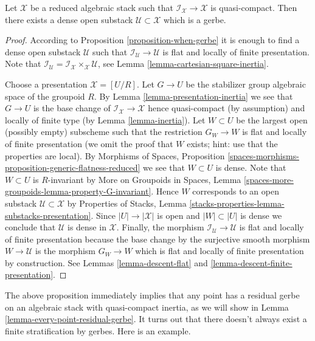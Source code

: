 \begin{proposition}
\label{proposition-open-stratum}
Let $\mathcal{X}$ be a reduced algebraic stack such that
$\mathcal{I}_\mathcal{X} \to \mathcal{X}$ is quasi-compact.
Then there exists a dense open substack $\mathcal{U} \subset \mathcal{X}$
which is a gerbe.
\end{proposition}

\begin{proof}
According to
Proposition \ref{proposition-when-gerbe}
it is enough to find a dense open substack $\mathcal{U}$ such that
$\mathcal{I}_\mathcal{U} \to \mathcal{U}$ is flat and locally of finite
presentation. Note that
$\mathcal{I}_\mathcal{U} =
\mathcal{I}_\mathcal{X} \times_\mathcal{X} \mathcal{U}$, see
Lemma \ref{lemma-cartesian-square-inertia}.

\medskip\noindent
Choose a presentation $\mathcal{X} = [U/R]$. Let $G \to U$ be the stabilizer
group algebraic space of the groupoid $R$. By
Lemma \ref{lemma-presentation-inertia}
we see that $G \to U$ is the base change of
$\mathcal{I}_\mathcal{X} \to \mathcal{X}$ hence quasi-compact (by assumption)
and locally of finite type (by
Lemma \ref{lemma-inertia}).
Let $W \subset U$ be the largest open (possibly empty) subscheme such that
the restriction $G_W \to W$ is flat and locally of finite presentation
(we omit the proof that $W$ exists; hint: use that the properties are local).
By
Morphisms of Spaces, Proposition
\ref{spaces-morphisms-proposition-generic-flatness-reduced}
we see that $W \subset U$ is dense. Note that $W \subset U$ is $R$-invariant
by
More on Groupoids in Spaces, Lemma
\ref{spaces-more-groupoids-lemma-property-G-invariant}.
Hence $W$ corresponds to an open substack $\mathcal{U} \subset \mathcal{X}$ by
Properties of Stacks, Lemma
\ref{stacks-properties-lemma-substacks-presentation}.
Since $|U| \to |\mathcal{X}|$ is open and $|W| \subset |U|$ is dense we
conclude that $\mathcal{U}$ is dense in $\mathcal{X}$.
Finally, the morphism $\mathcal{I}_\mathcal{U} \to \mathcal{U}$
is flat and locally of finite presentation because the base change by
the surjective smooth morphism $W \to \mathcal{U}$ is the morphism
$G_W \to W$ which is flat and locally of finite presentation by construction.
See
Lemmas \ref{lemma-descent-flat} and
\ref{lemma-descent-finite-presentation}.
\end{proof}

\noindent
The above proposition immediately implies that any point has a residual
gerbe on an algebraic stack with quasi-compact inertia, as we will show in
Lemma \ref{lemma-every-point-residual-gerbe}.
It turns out that there doesn't always exist a finite stratification
by gerbes. Here is an example.

